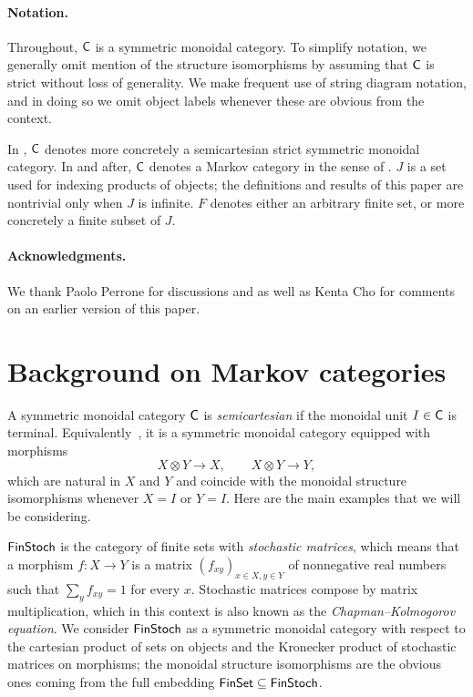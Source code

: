 \documentclass[11pt]{article}
\begin{document}
\paragraph*{Notation.} 

Throughout, $\mathsf{C}$ is a symmetric monoidal category. To simplify notation, we generally omit mention of the structure isomorphisms by assuming that $\mathsf{C}$ is strict without loss of generality. We make frequent use of string diagram notation, and in doing so we omit object labels whenever these are obvious from the context.

In , $\mathsf{C}$ denotes more concretely a semicartesian strict symmetric monoidal category. In  and after, $\mathsf{C}$ denotes a Markov category in the sense of . $J$ is a set used for indexing products of objects; the definitions and results of this paper are nontrivial only when $J$ is infinite. $F$ denotes either an arbitrary finite set, or more concretely a finite subset of $J$.

\paragraph*{Acknowledgments.} We thank Paolo Perrone for discussions and  as well as Kenta Cho for comments on an earlier version of this paper.

\section{Background on Markov categories}\label{background}

A symmetric monoidal category $\mathsf{C}$ is \emph{semicartesian} if the monoidal unit $I \in \mathsf{C}$ is terminal. Equivalently~\cite[Theorem~3.5]{GLS}, it is a symmetric monoidal category equipped with morphisms
\begin{equation}
	\label{projections}
	X \otimes Y \longrightarrow X, \qquad X \otimes Y \longrightarrow Y,
\end{equation}
which are natural in $X$ and $Y$ and coincide with the monoidal structure isomorphisms whenever $X = I$ or $Y = I$. Here are the main examples that we will be considering.

\begin{example}
	\label{finstoch}
	$\operatorname{\mathsf{FinStoch}}$ is the category of finite sets with \emph{stochastic matrices}, which means that a morphism $f : X \to Y$ is a matrix $(f_{xy})_{x \in X,y \in Y}$ of nonnegative real numbers such that $\sum_y f_{xy} = 1$ for every $x$. Stochastic matrices compose by matrix multiplication, which in this context is also known as the \emph{Chapman--Kolmogorov equation}. We consider $\operatorname{\mathsf{FinStoch}}$ as a symmetric monoidal category with respect to the cartesian product of sets on objects and the Kronecker product of stochastic matrices on morphisms; the monoidal structure isomorphisms are the obvious ones coming from the full embedding $\operatorname{\mathsf{FinSet}} \subseteq \operatorname{\mathsf{FinStoch}}$.
\end{example}
\end{document}

